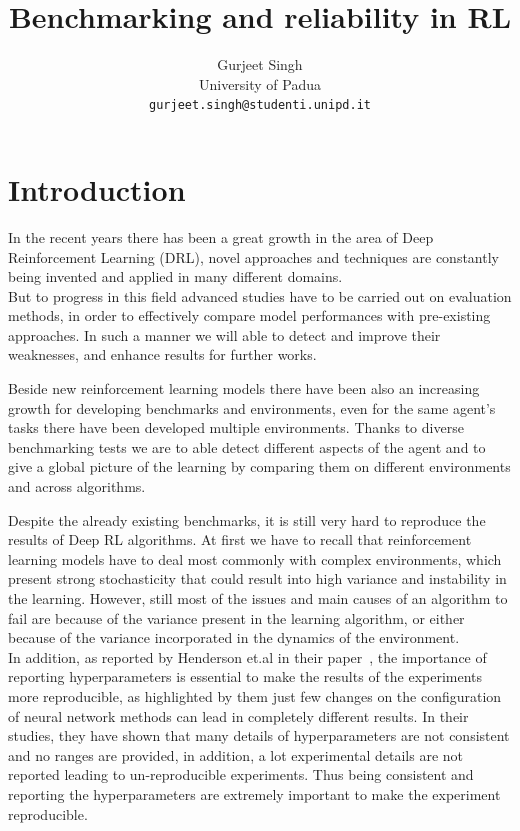 \documentclass{article}
\title{Benchmarking and reliability in RL}
\author{Gurjeet Singh\\
  University of Padua\\
  \texttt{gurjeet.singh@studenti.unipd.it}
}
\begin{document}
\maketitle

\begin{abstract}
\end{abstract}

\section{Introduction}
In the recent years there has been a great growth in the area of Deep Reinforcement Learning (DRL), novel approaches and techniques are constantly being invented and applied in many different domains.\\
But to progress in this field advanced studies have to be carried out on evaluation methods, in order to effectively compare model performances with pre-existing approaches. In such a manner we will able to detect and improve their weaknesses, and enhance results for further works.

Beside new reinforcement learning models there have been also an increasing growth for developing benchmarks and environments, even for the same agent's tasks there have been developed multiple environments.
Thanks to diverse benchmarking tests we are to able detect different aspects of the agent and to give a global picture of the learning by comparing them on different environments and across algorithms.

Despite the already existing benchmarks, it is still very hard to reproduce the results of Deep RL algorithms. At first we have to recall that reinforcement learning models have to deal most commonly with complex environments, which present strong stochasticity that could result into high variance and instability in the learning. However, still most of the issues and main causes of an algorithm to fail are because of the variance present in the learning algorithm, or either because of the variance incorporated in the dynamics of the environment.\\
In addition, as reported by Henderson et.al in their paper~\cite{DRL01}, the importance of reporting hyperparameters is essential to make the results of the experiments more reproducible, as highlighted by them just few changes on the configuration of neural network methods can lead in completely different results. In their studies, they have shown that many details of hyperparameters are not consistent and no ranges are provided, in addition, a lot experimental details are not reported leading to un-reproducible experiments. Thus being consistent and reporting the hyperparameters are extremely important to make the experiment reproducible.
\end{document}
